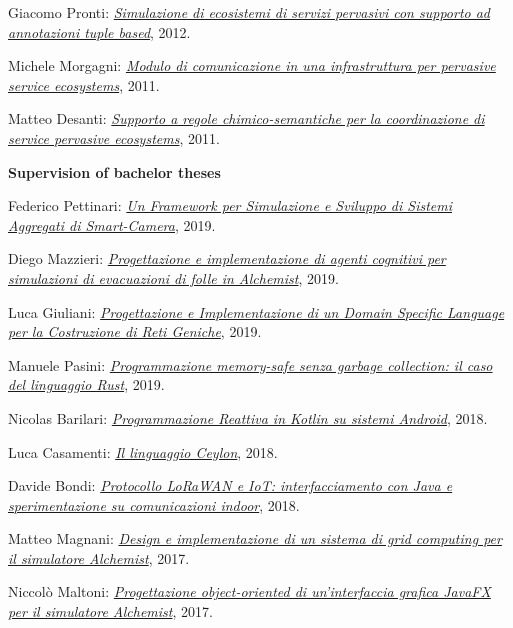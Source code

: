 \begin{outerlist}
\begin{innerlist}
      \item Giacomo Pronti: \href{http://archive.fo/nBeOg}{\textit{Simulazione di ecosistemi di servizi pervasivi con supporto ad annotazioni tuple based}}, 2012.
      \item Michele Morgagni: \href{http://archive.fo/6mnSN}{\textit{Modulo di comunicazione in una infrastruttura per pervasive service ecosystems}}, 2011.
      \item Matteo Desanti: \href{http://archive.fo/rwla1}{\textit{Supporto a regole chimico-semantiche per la coordinazione di service pervasive ecosystems}}, 2011.
    \end{innerlist}
\item[] \textbf{Supervision of bachelor theses} %
    \begin{innerlist}
      \item Federico Pettinari: \href{https://amslaurea.unibo.it/19092/}{\textit{Un Framework per Simulazione e Sviluppo di Sistemi Aggregati di Smart-Camera}}, 2019.
      \item Diego Mazzieri: \href{https://amslaurea.unibo.it/19084/}{\textit{Progettazione e implementazione di agenti cognitivi per simulazioni di evacuazioni di folle in Alchemist}}, 2019.
      \item Luca Giuliani: \href{https://amslaurea.unibo.it/19071/}{\textit{Progettazione e Implementazione di un Domain Specific Language per la Costruzione di Reti Geniche}}, 2019.
      \item Manuele Pasini: \href{http://amslaurea.unibo.it/18535/}{\textit{Programmazione memory-safe senza garbage collection: il caso del linguaggio Rust}}, 2019.
      \item Nicolas Barilari: \href{http://amslaurea.unibo.it/16841/}{\textit{Programmazione Reattiva in Kotlin su sistemi Android}}, 2018.
      \item Luca Casamenti: \href{http://amslaurea.unibo.it/16788/}{\textit{Il linguaggio Ceylon}}, 2018.
      \item Davide Bondi: \href{http://amslaurea.unibo.it/15730/}{\textit{Protocollo LoRaWAN e IoT: interfacciamento con Java e sperimentazione su comunicazioni indoor}}, 2018.
      \item Matteo Magnani: \href{http://amslaurea.unibo.it/17133/}{\textit{Design e implementazione di un sistema di grid computing per il simulatore Alchemist}}, 2017.
      \item Niccolò Maltoni: \href{http://amslaurea.unibo.it/14682/}{\textit{Progettazione object-oriented di un'interfaccia grafica JavaFX per il simulatore Alchemist}}, 2017.

\end{innerlist}
\end{outerlist}
